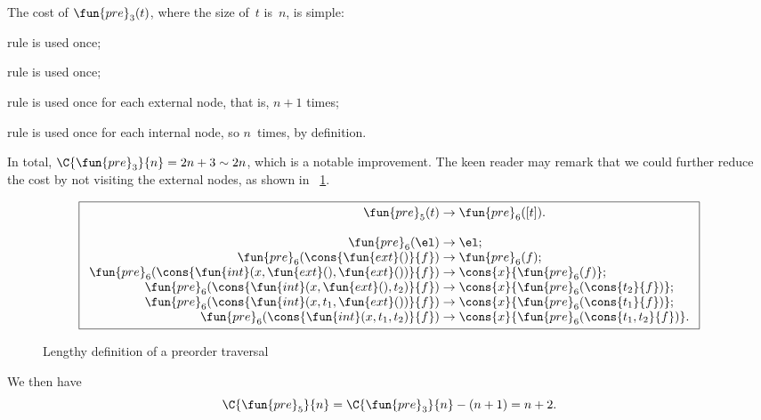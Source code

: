 
The cost of \(\fun{pre}_3(t)\), where
the size of~\(t\) is~\(n\), is simple:
\begin{itemize*}

  \item rule \clause{\alpha} is used once;

  \item rule \clause{\beta} is used once;

  \item rule \clause{\gamma} is used once for each external node, that
    is, \(n+1\) times;%

  \item rule \clause{\delta} is used once for each internal node, so
    \(n\)~times, by definition.

\end{itemize*}
In total, \(\C{\fun{pre}_3}{n} = 2n + 3 \sim
2n\), which is a notable
improvement. The keen reader may remark that we could further reduce
the cost by not visiting the external nodes, as shown in
\fig~\ref{fig:pre5}.
\begin{figure}[t]
\begin{equation*}
\boxed{
\begin{array}{r@{\;}c@{\;}l}
\fun{pre}_5(t) & \rightarrow & \fun{pre}_6([t]).\\
\\
\fun{pre}_6(\el) & \rightarrow & \el;\\
\fun{pre}_6(\cons{\fun{ext}()}{f})
  & \rightarrow & \fun{pre}_6(f);\\
\fun{pre}_6(\cons{\fun{int}(x,\fun{ext}(),\fun{ext}())}{f})
  & \rightarrow & \cons{x}{\fun{pre}_6(f)};\\
\fun{pre}_6(\cons{\fun{int}(x,\fun{ext}(),t_2)}{f})
  & \rightarrow & \cons{x}{\fun{pre}_6(\cons{t_2}{f})};\\
\fun{pre}_6(\cons{\fun{int}(x, t_1, \fun{ext}())}{f})
  & \rightarrow & \cons{x}{\fun{pre}_6(\cons{t_1}{f})};\\
\fun{pre}_6(\cons{\fun{int}(x,t_1,t_2)}{f})
  & \rightarrow & \cons{x}{\fun{pre}_6(\cons{t_1,t_2}{f})}.
\end{array}}
\end{equation*}
\caption{Lengthy definition of a preorder traversal}
\label{fig:pre5}
\end{figure}
We then have
\begin{equation*}
\C{\fun{pre}_5}{n} = \C{\fun{pre}_3}{n} - (n+1) = n + 2.
\end{equation*}
